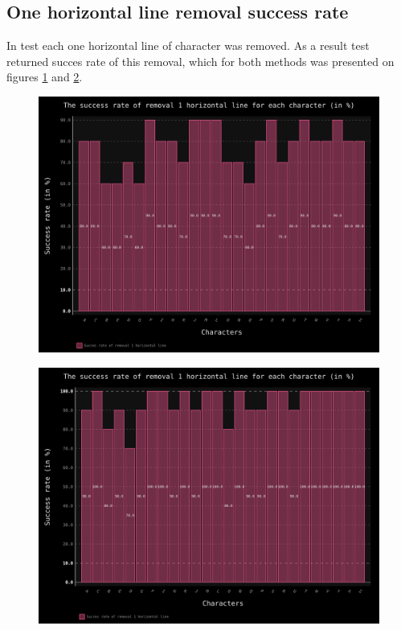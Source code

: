 \documentclass[a4paper]{article}
\begin{document}
\clearpage
\subsection{One horizontal line removal success rate}
In test each one horizontal line of character was removed. As a result test returned succes rate of this removal, which for both methods was presented on figures \ref{hor_line_trans} and \ref{hor_line_clas}.
\begin{figure}[ht]
	\centering
	\includegraphics[scale=0.7,keepaspectratio=true]{Charts/HorLineTestPlanResultsChart_NormalTester.png}	
	\caption{}
	\label{hor_line_trans}
\end{figure}

\begin{figure}[t]
	\centering
	\includegraphics[scale=0.7,keepaspectratio=true]{Charts/HorLineTestPlanResultsChart_ClasifierTester.png}	
	\caption{}
	\label{hor_line_clas}
\end{figure}
\end{document}
